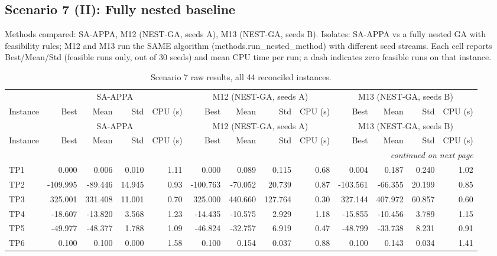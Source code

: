 \subsection{Scenario 7 (II): Fully nested baseline}
\label{app:scenario7}
Methods compared: SA-APPA, M12 (NEST-GA, seeds A), M13 (NEST-GA, seeds B). Isolates: SA-APPA vs a fully nested GA with feasibility rules; M12 and M13 run the SAME algorithm (methods.run\_nested\_method) with different seed streams. Each cell reports Best/Mean/Std (feasible runs only, out of 30 seeds) and mean CPU time per run; a dash indicates zero feasible runs on that instance.

\begingroup\scriptsize
\begin{longtable}{lrrrrrrrrrrrr}
\caption{Scenario 7 raw results, all 44 reconciled instances.}\label{tab:scenario7}\\
\toprule
 & \multicolumn{4}{c}{SA-APPA} & \multicolumn{4}{c}{M12 (NEST-GA, seeds A)} & \multicolumn{4}{c}{M13 (NEST-GA, seeds B)} \\
\cmidrule(lr){2-5} \cmidrule(lr){6-9} \cmidrule(lr){10-13}
Instance & Best & Mean & Std & CPU (s) & Best & Mean & Std & CPU (s) & Best & Mean & Std & CPU (s) \\
\midrule
\endfirsthead
\toprule
 & \multicolumn{4}{c}{SA-APPA} & \multicolumn{4}{c}{M12 (NEST-GA, seeds A)} & \multicolumn{4}{c}{M13 (NEST-GA, seeds B)} \\
\cmidrule(lr){2-5} \cmidrule(lr){6-9} \cmidrule(lr){10-13}
Instance & Best & Mean & Std & CPU (s) & Best & Mean & Std & CPU (s) & Best & Mean & Std & CPU (s) \\
\midrule
\endhead
\midrule\multicolumn{13}{r}{\emph{continued on next page}}\\\midrule
\endfoot
\bottomrule
\endlastfoot
TP1 & 0.000 & 0.006 & 0.010 & 1.11 & 0.000 & 0.089 & 0.115 & 0.68 & 0.004 & 0.187 & 0.240 & 1.02 \\
TP2 & -109.995 & -89.446 & 14.945 & 0.93 & -100.763 & -70.052 & 20.739 & 0.87 & -103.561 & -66.355 & 20.199 & 0.85 \\
TP3 & 325.001 & 331.408 & 11.001 & 0.70 & 325.000 & 440.660 & 127.764 & 0.30 & 327.144 & 407.972 & 60.857 & 0.60 \\
TP4 & -18.607 & -13.820 & 3.568 & 1.23 & -14.435 & -10.575 & 2.929 & 1.18 & -15.855 & -10.456 & 3.789 & 1.15 \\
TP5 & -49.977 & -48.377 & 1.788 & 1.09 & -46.824 & -32.757 & 6.919 & 0.47 & -48.799 & -33.738 & 8.231 & 0.91 \\
TP6 & 0.100 & 0.100 & 0.000 & 1.58 & 0.100 & 0.154 & 0.037 & 0.88 & 0.100 & 0.143 & 0.034 & 1.41 \\

\end{longtable}
